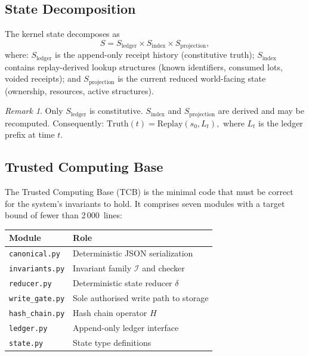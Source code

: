 \documentclass[11pt,a4paper]{article}
\theoremstyle{plain}
\theoremstyle{definition}
\theoremstyle{remark}
\newtheorem{remark}[theorem]{Remark}
\newcommand{\Replay}{\mathrm{Replay}}
\newcommand{\Inv}{\mathcal{I}}
\begin{document}
\subsection{State Decomposition}

The kernel state decomposes as
\[
  S = S_{\mathrm{ledger}} \times S_{\mathrm{index}} \times S_{\mathrm{projection}},
\]
where:
$S_{\mathrm{ledger}}$ is the append-only receipt history (constitutive truth);
$S_{\mathrm{index}}$ contains replay-derived lookup structures
(known identifiers, consumed lots, voided receipts); and
$S_{\mathrm{projection}}$ is the current reduced world-facing state
(ownership, resources, active structures).

\begin{remark}
Only $S_{\mathrm{ledger}}$ is constitutive.
$S_{\mathrm{index}}$ and $S_{\mathrm{projection}}$ are derived and may be recomputed.
Consequently:
$\mathrm{Truth}(t) = \Replay(s_0, L_t),$
where $L_t$ is the ledger prefix at time $t$.
\end{remark}

\subsection{Trusted Computing Base}
\label{sec:tcb}

The Trusted Computing Base (TCB) is the minimal code that must be correct
for the system's invariants to hold.
It comprises seven modules with a target bound of fewer than 2\,000~lines:

\begin{center}
\begin{tabular}{ll}
\toprule
Module & Role \\
\midrule
\texttt{canonical.py}   & Deterministic JSON serialization \\
\texttt{invariants.py}  & Invariant family $\Inv$ and checker \\
\texttt{reducer.py}     & Deterministic state reducer $\delta$ \\
\texttt{write\_gate.py} & Sole authorised write path to storage \\
\texttt{hash\_chain.py} & Hash chain operator $H$ \\
\texttt{ledger.py}      & Append-only ledger interface \\
\texttt{state.py}       & State type definitions \\
\bottomrule
\end{tabular}
\end{center}
\end{document}
